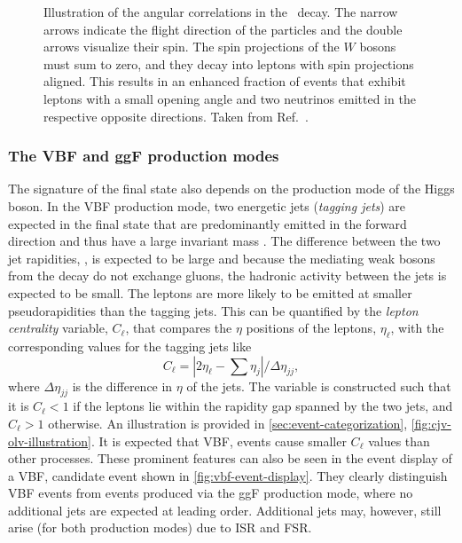 \begin{figure}
    \caption[Angular correlations in the \HWWdet\ decay.]{Illustration of the angular correlations in the \HWWdet\ decay. The narrow arrows indicate the flight direction of the particles and the double arrows visualize their spin. The spin projections of the $W$ bosons must sum to zero, and they decay into leptons with spin projections aligned. This results in an enhanced fraction of events that exhibit leptons with a small opening angle and two neutrinos emitted in the respective opposite directions. Taken from Ref.~\cite{HIGG-2013-13}.}
    \label{fig:spin-correlations}
\end{figure}

\subsubsection{The VBF and ggF production modes}
The signature of the final state also depends on the production mode of the Higgs boson.
In the VBF production mode, two energetic jets (\emph{tagging jets}) are expected in the final state that are predominantly emitted in the forward direction and thus have a large invariant mass \mjj. 
The difference between the two jet rapidities, \dyjj, is expected to be large and because the mediating weak bosons from the \HWW decay do not exchange gluons, the hadronic activity between the jets is expected to be small. 
The leptons are more likely to be emitted at smaller pseudorapidities than the tagging jets. This can be quantified by the \emph{lepton centrality} variable, $C_\ell$, that compares the $\eta$ positions of the leptons, $\eta_\ell$, with the corresponding values for the tagging jets like
\begin{equation}
    C_\ell = |2\eta_\ell - \sum \eta_j| / \Delta \eta_{jj},
\end{equation}
where $\Delta \eta_{jj}$ is the difference in $\eta$ of the jets. 
The variable is constructed such that it is $C_\ell < 1$ if the leptons lie within the rapidity gap spanned by the two jets, and $C_\ell > 1$ otherwise. An illustration is provided in \cref{sec:event-categorization}, \cref{fig:cjv-olv-illustration}. 
It is expected that VBF, \HWW events cause smaller $C_\ell$ values than other processes.
These prominent features can also be seen in the event display of a VBF, \HWW candidate event shown in \cref{fig:vbf-event-display}. 
They clearly distinguish VBF events from events produced via the ggF production mode, where no additional jets are expected at leading order. 
Additional jets may, however, still arise (for both production modes) due to ISR and FSR. 

